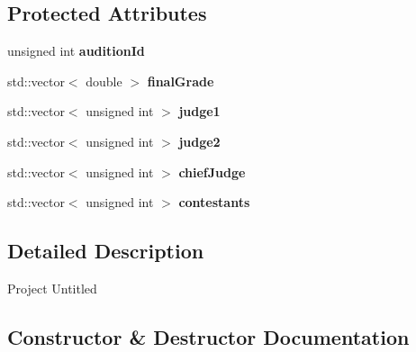 \subsection*{Protected Attributes}
\begin{DoxyCompactItemize}
\item 
\mbox{\label{class_fase_a23da3f134d27b245f63f360139e34472}} 
unsigned int {\bfseries audition\+Id}
\item 
\mbox{\label{class_fase_a9535376b5bcb948bb0597f3a8e42a0bd}} 
std\+::vector$<$ double $>$ {\bfseries final\+Grade}
\item 
\mbox{\label{class_fase_a3a9f904165996ac7e31c71adff5af91f}} 
std\+::vector$<$ unsigned int $>$ {\bfseries judge1}
\item 
\mbox{\label{class_fase_a30599777b01ec01afa4475a048305622}} 
std\+::vector$<$ unsigned int $>$ {\bfseries judge2}
\item 
\mbox{\label{class_fase_a317275a52edeaf34d2374defc44b3683}} 
std\+::vector$<$ unsigned int $>$ {\bfseries chief\+Judge}
\item 
\mbox{\label{class_fase_aa30cd5a93c8ba490e8ed4854c204d402}} 
std\+::vector$<$ unsigned int $>$ {\bfseries contestants}
\end{DoxyCompactItemize}


\subsection{Detailed Description}
Project Untitled 

\subsection{Constructor \& Destructor Documentation}
\mbox{\label{class_fase_a2c24bb5d2c4c0f3935c9843600b1b2ba}} 
